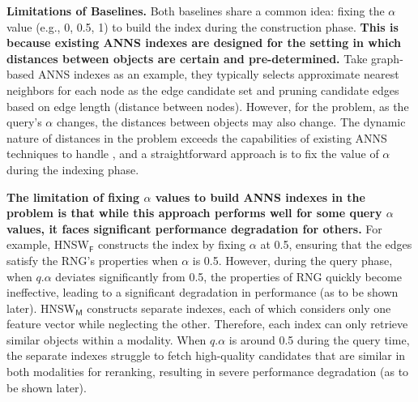 \noindent\textbf{Limitations of Baselines.} Both baselines share a common idea: fixing the $\alpha$ value (e.g., 0, 0.5, 1)
%
to build the index
during the 
construction phase. \textbf{This is because existing ANNS indexes are 
designed for the setting 
in which
distances between objects 
are certain and pre-determined.} Take graph-based ANNS indexes as an example, they typically %
selects approximate nearest neighbors %
for each node as the edge candidate set and pruning candidate edges based on edge length (distance between nodes). However, for the \hvq problem, as the query's $\alpha$ changes, the distances between objects may also change. The 
dynamic nature of
distances in the \hvq problem 
exceeds
the capabilities of existing ANNS techniques to handle%
, and a straightforward approach is to fix the value of $\alpha$ during the indexing phase.

\textbf{The limitation of fixing $\alpha$ values to build ANNS indexes in the \hvq problem is that while this approach performs well for some query $\alpha$ values, it faces significant performance degradation for others.} For example, %
\textsf{HNSW}$_{\textsf{F}}$ 
constructs the index by fixing $\alpha$ at 0.5, ensuring that the edges satisfy the RNG's properties when $\alpha$ is 0.5. However, during the query phase, when $q.\alpha$ deviates
%
significantly from 0.5, the properties of RNG quickly
become ineffective, leading to a significant degradation in performance (as to be shown later). 
\textsf{HNSW}$_{\textsf{M}}$ 
constructs separate indexes, 
each of which considers only one feature vector while neglecting the other. Therefore, each index can only retrieve similar objects within a modality. When $q.\alpha$ is around 0.5 during the query time, the separate indexes struggle to fetch high-quality candidates that are similar in both modalities for reranking, resulting in severe performance degradation (as to be shown later).



